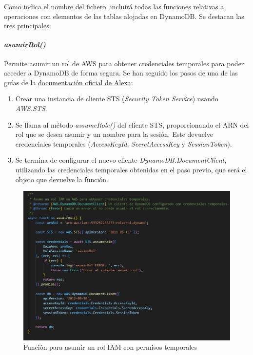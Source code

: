 Como indica el nombre del fichero, incluirá todas las funciones relativas a operaciones con elementos de las tablas alojadas en DynamoDB. Se destacan las tres principales:

\paragraph{\textit{asumirRol()}}

Permite asumir un rol de AWS para obtener credenciales temporales para poder acceder a DynamoDB de forma segura. Se han seguido los pasos de una de las guías de la \href{https://developer.amazon.com/en-US/docs/alexa/hosted-skills/alexa-hosted-skills-personal-aws.html}{documentación oficial de Alexa}:

\begin{enumerate}
	\item Crear una instancia de cliente STS (\textit{Security Token Service}) usando \textit{AWS.STS}.
	\item Se llama al método \textit{assumeRole()} del cliente STS, proporcionando el ARN del rol que se desea asumir y un nombre para la sesión. Este devuelve credenciales temporales (\textit{AccessKeyId}, \textit{SecretAccessKey} y \textit{SessionToken}).
	\item Se termina de configurar el nuevo cliente \textit{DynamoDB.DocumentClient}, utilizando las credenciales temporales obtenidas en el paso previo, que será el objeto que devuelve la función.
\end{enumerate}

\begin{figure}[H]
	\centering
	\includegraphics{imgs/codigo-db-1.jpg}
	\caption{Función para asumir un rol IAM con permisos temporales}
	\label{fig:codigo-db-1}
\end{figure}

